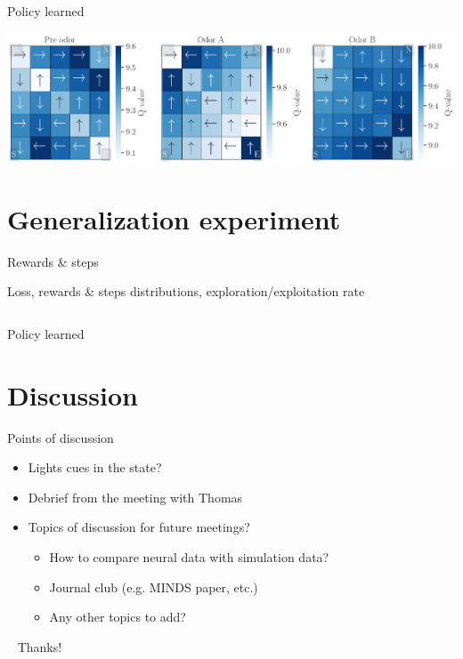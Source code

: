 \documentclass[bigger]{beamer}
\begin{document}
\begin{frame}[label={sec:orgded8bfd}]{Policy learned}
\begin{center}
\includegraphics[width=\linewidth]{img/policy.png}
\end{center}
\end{frame}
\section{Generalization experiment}
\label{sec:org8868606}
\begin{frame}[label={sec:org7c58d85}]{Rewards \& steps}
\end{frame}
\begin{frame}[label={sec:org9aee9e4}]{Loss, rewards \& steps distributions, exploration/exploitation rate}
\begin{columns}
\begin{column}{0.4\columnwidth}
\end{column}
\begin{column}{0.4\columnwidth}
\end{column}
\end{columns}
\end{frame}
\begin{frame}[label={sec:org4580b81}]{Policy learned}
\end{frame}
\section{Discussion}
\label{sec:org10c2e2d}
\begin{frame}[<+->][label={sec:org1ba1da4}]{Points of discussion}
\begin{itemize}
\item Lights cues in the state?
\item Debrief from the meeting with Thomas
\item Topics of discussion for future meetings?
\begin{itemize}
\item How to compare neural data with simulation data?
\item Journal club (e.g. MINDS paper, etc.)
\item Any other topics to add?
\end{itemize}
\end{itemize}
\end{frame}
\begin{frame}[label={sec:orgfe893dd},standout]{~}
Thanks!
\end{frame}
\end{document}
